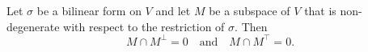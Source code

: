 Let $\sigma$ be a bilinear form on $V$ and let $M$ be a subspace of $V$ that is non-degenerate with respect to the restriction of $\sigma$. Then
$$M \cap M^{\perp} = 0 \quad \text{and} \quad M \cap M^{\top} = 0.$$
